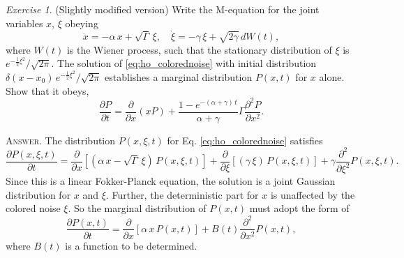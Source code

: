 \documentclass{book}
\numberwithin{equation}{section}
\theoremstyle{plain}
\theoremstyle{definition}
\theoremstyle{remark}
\theoremstyle{BoldStyle}
\newtheorem{exercise}{Exercise}
\numberwithin{exercise}{section}
\newcommand{\answer}[1]{{\color{DarkBlue}\footnotesize \textsc{Answer.} #1}}
\begin{document}
\begin{exercise}
  (Slightly modified version)
  Write the M-equation for the joint variables $x$, $\xi$ obeying
  \begin{equation}
  \dot x = -\alpha \, x + \sqrt{\Gamma} \, \xi,
  \quad
  \dot \xi = -\gamma \, \xi + \sqrt{2 \gamma} \, d W(t),
  \label{eq:ho_colorednoise}
  \end{equation}
  where $W(t)$ is the Wiener process,
  such that the stationary distribution of $\xi$
  is $e^{-\frac{1}{2}\xi^2}/\sqrt{2\pi}$.
  The solution of \eqref{eq:ho_colorednoise} with initial distribution
  $\delta(x - x_0) \, e^{-\frac{1}{2}\xi^2}/\sqrt{2\pi}$
  establishes a marginal distribution $P(x, t)$
  for $x$ alone. Show that it obeys,
  \begin{equation}
  \frac{ \partial P } { \partial t } = \frac{ \partial } { \partial x } (x P)
  +
  \frac{ 1 - e^{-(\alpha + \gamma) \, t} } {\alpha + \gamma} \Gamma
  \frac{ \partial^2 P } { \partial x^2 }.
  \label{eq:ho_colorednoise_Px}
  \end{equation}

  \answer{
    The distribution $P(x, \xi, t)$ for
    Eq. \eqref{eq:ho_colorednoise} satisfies
    $$
    \frac{ \partial P(x, \xi, t) } { \partial t }
    =
    \frac{ \partial } { \partial x }
    \left[
      \left( \alpha \, x - \sqrt{\Gamma} \, \xi \right) \, P(x, \xi, t)
    \right]
    +
    \frac{ \partial } { \partial \xi }
    \left[
      (\gamma \, \xi ) \, P(x, \xi, t)
    \right]
    +
    \gamma
    \frac{ \partial^2 } { \partial \xi^2} P(x, \xi, t).
    $$
    Since this is a linear Fokker-Planck equation,
    the solution is a joint Gaussian distribution
    for $x$ and $\xi$.
    Further, the deterministic part for $x$
    is unaffected by the colored noise $\xi$.
    So the marginal distribution of $P(x, t)$
    must adopt the form of
    \begin{equation}
    \frac{ \partial P(x, t) } { \partial t }
    =
    \frac{ \partial } { \partial x }
    \left[
      \alpha \, x \, P(x, t)
    \right]
    +
    B(t)
    \frac{ \partial^2 } { \partial x^2} P(x, t),
    \label{eq:ho_colorednoise_Px1}
    \end{equation}
    where $B(t)$
    is a function to be determined.

}
\end{exercise}
\end{document}
